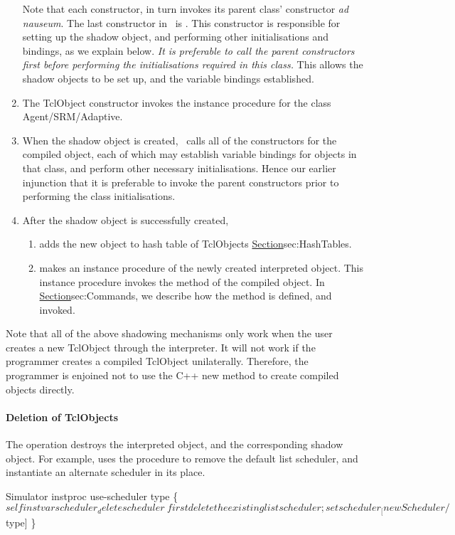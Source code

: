 \begin{enumerate}
  Note that each constructor,
  in turn invokes its parent class' constructor \textit{ad nauseum}.
  The last constructor in \ns\ is
  .
  This constructor is responsible for setting up the shadow object, and 
  performing other initialisations and bindings, as we explain below.
  \emph{It is preferable to call the parent constructors first before
    performing the initialisations required in this class.}
  This allows the shadow objects to be set up,
  and the variable bindings established.
\item The TclObject constructor invokes the instance procedure
   for the class Agent/SRM/Adaptive.
\item When the shadow object is created,
  \ns\ calls all of the constructors for the compiled object,
  each of which may establish variable bindings for objects in that class,
  and perform other necessary initialisations.
  Hence our earlier injunction that it is preferable to invoke the parent
  constructors prior to performing the class initialisations.
\item After the shadow object is successfully created,
  \begin{enumerate}
  \item adds the new object to hash table of TclObjects
        \href{described earlier}{Section}{sec:HashTables}.
  \item makes  an instance procedure of the newly created
    interpreted object.
    This instance procedure
    invokes the  method of the compiled object.
    In \href{a later subsection}{Section}{sec:Commands},
    we describe how the  method is defined, and invoked.
  \end{enumerate}
\end{enumerate}
Note that all of the above shadowing mechanisms only work when
the user creates a new TclObject through the interpreter.
It will not work if the programmer creates a compiled TclObject unilaterally.
Therefore, the programmer is enjoined not to use the C++ new method
to create compiled objects directly.

\paragraph{Deletion of TclObjects}
The  operation
destroys the interpreted object, and the corresponding shadow object.
For example,
uses the  procedure to remove the default list scheduler,
and instantiate an alternate scheduler in its place.
\begin{program}
        Simulator instproc use-scheduler type \{
                $self instvar scheduler_

                delete scheduler_ \; first delete the existing list scheduler;
                set scheduler_ [new Scheduler/$type]
        \}
\end{program}

